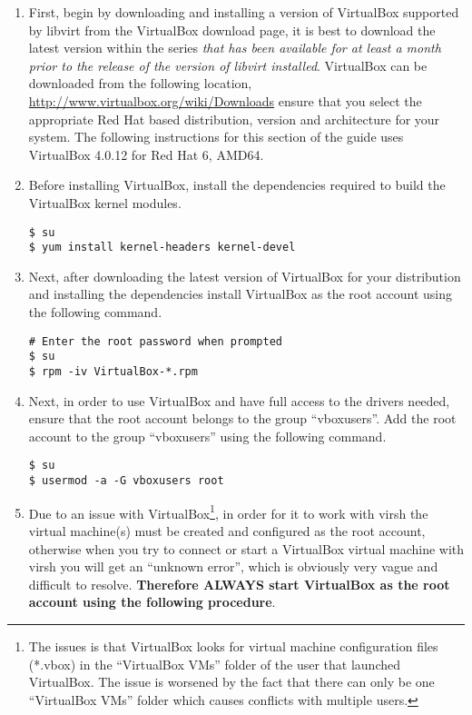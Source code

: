 \begin{enumerate}
\item	First, begin by downloading and installing a version of VirtualBox supported by libvirt from the VirtualBox download 
			page, it is best to download the latest version within the series \emph{that has been available for at least a month 
			prior to the release of the version of libvirt installed}. VirtualBox can be downloaded from the following location,  
			\url{http://www.virtualbox.org/wiki/Downloads} ensure that you select the appropriate Red Hat based distribution, 
			version and architecture for your system. The following instructions for this section of the guide uses VirtualBox 
			4.0.12 for Red Hat 6, AMD64.
		 	
\item	Before installing VirtualBox, install the dependencies required to build the VirtualBox kernel modules.

\lstset{language=bash,caption=Install VirtualBox Dependencies}
\begin{lstlisting}
$ su
$ yum install kernel-headers kernel-devel
\end{lstlisting}
		 	
\item	Next, after downloading the latest version of VirtualBox for your distribution and installing the dependencies 
			install VirtualBox as the root account using the following command.
			
\begin{lstlisting}
# Enter the root password when prompted
$ su
$ rpm -iv VirtualBox-*.rpm
\end{lstlisting}	

\item	Next, in order to use VirtualBox and have full access to the drivers needed, ensure that the root
			account belongs to the group ``vboxusers''. Add the root account to the group ``vboxusers'' using
			the following command.

\lstset{language=bash,caption=Add root to vboxusers}
\begin{lstlisting}
$ su
$ usermod -a -G vboxusers root
\end{lstlisting}
		
\item	Due to an issue with VirtualBox\footnote{The issues is that VirtualBox looks for virtual machine configuration files (*.vbox)
		in the ``VirtualBox VMs'' folder of the user that launched VirtualBox. The issue is worsened by the fact that there can
		only be one ``VirtualBox VMs'' folder which causes conflicts with multiple users.}, in order for it to work with virsh 
		the virtual machine(s) must be created and configured as the root account, otherwise when you try to connect or start a 
		VirtualBox virtual machine with virsh you will get an ``unknown error'', which is obviously very vague and difficult to 
		resolve. {\bf Therefore ALWAYS start VirtualBox as the root account using the following procedure}.


\end{enumerate}
